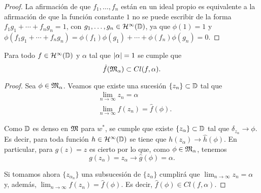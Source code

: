 \begin{proof}
La afirmación de que $f_1, \dots, f_n$ están en un ideal propio es equivalente a la afirmación de que la función constante $1$ no se puede escribir de la forma $f_1 g_1 + \cdots + f_n g_n = 1$, con $g_1, \dots, g_n \in \mathcal{H}^{\infty}(\mathbb{D})$, ya que $\phi (1) = 1$ y $\phi (f_1 g_1 + \cdots + f_n g_n) = \phi (f_1) \phi (g_1) + \cdots + \phi (f_n) \phi (g_n) = 0$.
\end{proof}

\begin{prop}
    Para todo $f \in \mathcal{H}^{\infty}(\mathbb{D})$ y $\alpha$ tal que $\left\lvert\alpha\right\rvert = 1$ se cumple que
    \begin{equation*}
        \hat{f} (\mathfrak{M}_\alpha) \subset Cl(f, \alpha).
    \end{equation*}
\end{prop}

\begin{proof}
    Sea $\phi \in \mathfrak{M}_\alpha$. Veamos que existe una sucesión $\{ z_n\} \subset \mathbb{D}$ tal que
     \leqnomode
    \begin{align}
        & \lim_{n \rightarrow \infty} z_n = \alpha \\
        & \lim_{n \rightarrow \infty} f(z_n)= \hat{f} (\phi).
    \end{align}

    Como $\mathbb{D}$ es denso en $\mathfrak{M}$ para $w^*$, se cumple que existe $\{z_\alpha\} \subset \mathbb{D}$ tal que $\delta_{z_\alpha} \rightarrow \phi$. Es decir, para toda función $h \in \mathcal{H}^{\infty}(\mathbb{D})$ se tiene que $h (z_\alpha) \rightarrow \hat{h} (\phi)$. En particular, para $g(z) = z$ es cierto por lo que, como $\phi \in \mathfrak{M}_\alpha$, tenemos
    \begin{equation*}
        g(z_\alpha) = z_\alpha \rightarrow \hat{g} (\phi) = \alpha.
    \end{equation*}

    Si tomamos ahora $\{z_{\alpha_n}\}$ una subsucesión de $\{z_\alpha\}$ cumplirá que $\lim_{n \rightarrow \infty} z_n = \alpha$ y, además, $\lim_{n \rightarrow \infty} f(z_n)= \hat{f} (\phi)$. Es decir, $\hat{f} (\phi) \in Cl (f, \alpha)$.
\end{proof}
